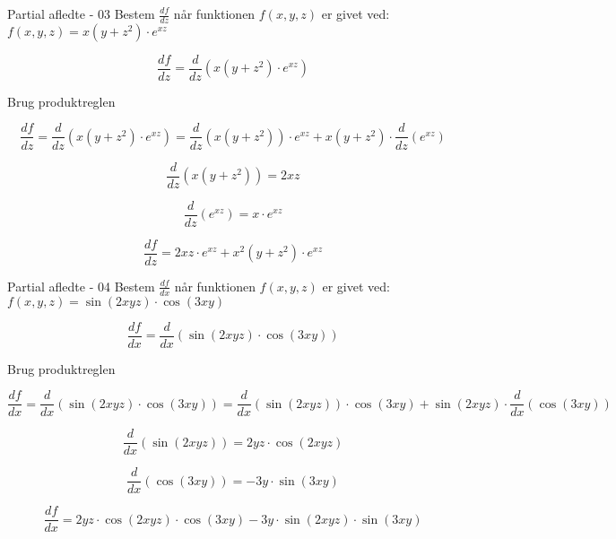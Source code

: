 \documentclass{article}
\begin{document}
\begin{exercise}{Partial afledte - 03}
	Bestem $\frac{df}{dz}$ når funktionen $f(x,y,z)$ er givet ved:
	$f(x,y,z) =x(y+z^2) \cdot e^{x z}$ 
	
	
	\hint
	\[
	\frac{df}{dz} = \frac{d}{dz} \left( x(y+z^2) \cdot e^{x z}\right) 
	\]
	
	\hint
	Brug produktreglen
	
	\hint
	\[
	\frac{df}{dz} = \frac{d}{dz} \left( x(y+z^2) \cdot e^{x z}\right) = \frac{d}{dz} \left(x(y+z^2) \right) \cdot e^{xz} + x(y+z^2) \cdot \frac{d}{dz}\left(e^{xz} \right)
	\]
	
	\hint
	\[
	\frac{d}{dz} \left(x(y+z^2)\right) = 2xz
	\]
	
	\hint
	\[
	\frac{d}{dz}\left( e^{xz}\right) =x \cdot e^{xz}
	\]
	
	\hint
	\[
	\frac{df}{dz}  = 2xz \cdot e^{xz} + x^2(y+z^2) \cdot e^{xz}
	\]
	
	
\end{exercise}

\begin{exercise}{Partial afledte - 04}
	Bestem $\frac{df}{dx}$ når funktionen $f(x,y,z)$ er givet ved: \\
	$f(x,y,z) = \sin(2xyz) \cdot \cos(3xy)$ 
	
	
	\hint
	\[
	\frac{df}{dx} = \frac{d}{dx} \left(  \sin(2xyz) \cdot \cos(3xy)\right) 
	\]
	
	\hint
	Brug produktreglen
	
	\hint
	\[
	\frac{df}{dx} = \frac{d}{dx} \left( \sin(2xyz) \cdot \cos(3xy)\right) = \frac{d}{dx} \left(\sin(2xyz) \right) \cdot \cos(3xy) + \sin(2xyz) \cdot \frac{d}{dx}\left( \cos(3xy)\right)
	\]
	
	\hint
	\[
	\frac{d}{dx} \left(\sin(2xyz) \right) = 2yz \cdot \cos(2xyz)
	\]
	
	\hint
	\[
	\frac{d}{dx}\left( \cos(3xy)\right) = -3y \cdot \sin(3xy)
	\]
	
	\hint
	\[
	\frac{df}{dx}  =  2yz \cdot \cos(2xyz) \cdot \cos(3xy) - 3y \cdot \sin(2xyz) \cdot \sin(3xy) 
	\]
	
	
\end{exercise}
\end{document}
